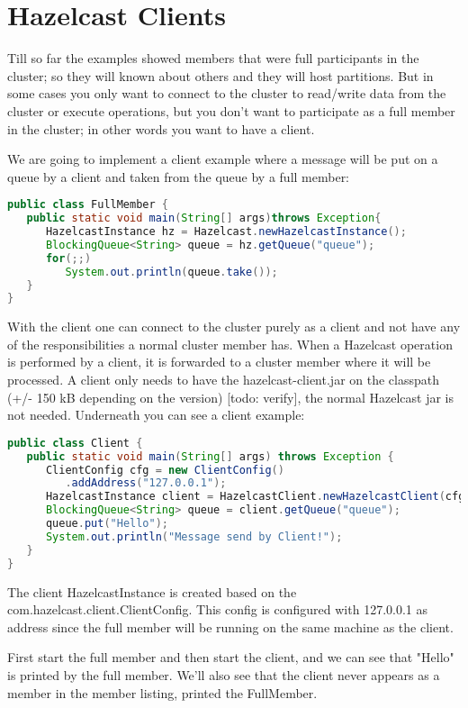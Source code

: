 \chapter{Hazelcast Clients}
Till so far the examples showed members that were full participants in the cluster; so they will known about others and they will host partitions. But in some cases you only want to connect to the cluster to read/write data from the cluster or execute operations, but you don't want to participate as a full member in the cluster; in other words you want to have a client.

We are going to implement a client example where a message will be put on a queue by a client and taken from the queue by a full member:
\begin{lstlisting}[language=java]
public class FullMember {
   public static void main(String[] args)throws Exception{
      HazelcastInstance hz = Hazelcast.newHazelcastInstance();
      BlockingQueue<String> queue = hz.getQueue("queue");
      for(;;) 
         System.out.println(queue.take());
   }
}
\end{lstlisting}

With the client one can connect to the cluster purely as a client and not have any of the responsibilities a normal cluster member has. When a Hazelcast operation is performed by a client, it is forwarded to a cluster member where it will be processed. A client only needs to have the hazelcast-client.jar on the classpath (+/- 150 kB depending on the version) [todo: verify], the normal Hazelcast jar is not needed. Underneath you can see a client example:
\begin{lstlisting}[language=java]
public class Client {
   public static void main(String[] args) throws Exception {
      ClientConfig cfg = new ClientConfig()
         .addAddress("127.0.0.1");
      HazelcastInstance client = HazelcastClient.newHazelcastClient(cfg);
      BlockingQueue<String> queue = client.getQueue("queue");
      queue.put("Hello");
      System.out.println("Message send by Client!");
   }
}
\end{lstlisting}
The client HazelcastInstance is created based on the com.hazelcast.client.ClientConfig. This config is configured with 127.0.0.1 as address since the full member will be running on the same machine as the client.

First start the full member and then start the client, and we can see that "Hello" is printed by the full member. We'll also see that the client never appears as a member in the member listing, printed the FullMember.

